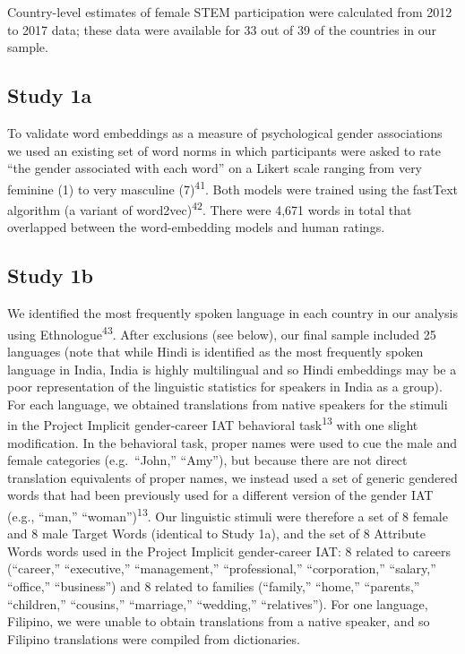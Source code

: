 \documentclass[11pt]{wlscirep}
\begin{document}
Country-level estimates of female STEM participation were calculated from 2012 to 2017 data; these data were available for 33 out of 39 of the countries in our sample.


\subsection*{Study 1a}


To validate word embeddings as a measure of psychological
gender associations we used an existing set of word norms in which participants
were asked to rate \enquote{the gender associated with each word} on a
Likert scale ranging from very feminine (1) to very
masculine (7)\textsuperscript{41}.  Both models were trained using the fastText algorithm (a variant of word2vec)\textsuperscript{42}. There were 4,671
words in total that overlapped between the word-embedding models and
human ratings.


\subsection*{Study 1b}

We identified the most frequently spoken language in each country in our
analysis using Ethnologue\textsuperscript{43}. After exclusions
(see below), our final sample included 25
languages (note that while Hindi is identified as the most frequently spoken language in India, India is highly multilingual and so Hindi embeddings may be a poor representation of  the linguistic statistics for speakers in India as a group).
For each language, we obtained translations from native speakers for the
stimuli in the Project Implicit gender-career IAT behavioral task\textsuperscript{13} with one slight modification. In the behavioral task,
proper names were used to cue the male and female categories
(e.g.~\enquote{John,} \enquote{Amy}), but because there are not direct
translation equivalents of proper names, we instead used a set of
generic gendered words that had been previously used for a different
version of the gender IAT (e.g., ``man,'' ``woman'')\textsuperscript{13}. Our linguistic stimuli were therefore a set of 8 female and 8
male Target Words (identical to Study 1a), and the set of 8 Attribute
Words words used in the Project Implicit gender-career IAT: 8 related to
careers (\enquote{career,} \enquote{executive,} \enquote{management,}
\enquote{professional,} \enquote{corporation,} \enquote{salary,}
\enquote{office,} \enquote{business}) and 8 related to families
(\enquote{family,} \enquote{home,} \enquote{parents,}
\enquote{children,} \enquote{cousins,} \enquote{marriage,}
\enquote{wedding,} \enquote{relatives}). For one language, Filipino, we
were unable to obtain translations from a native speaker, and so
Filipino translations were compiled from dictionaries.
\end{document}
